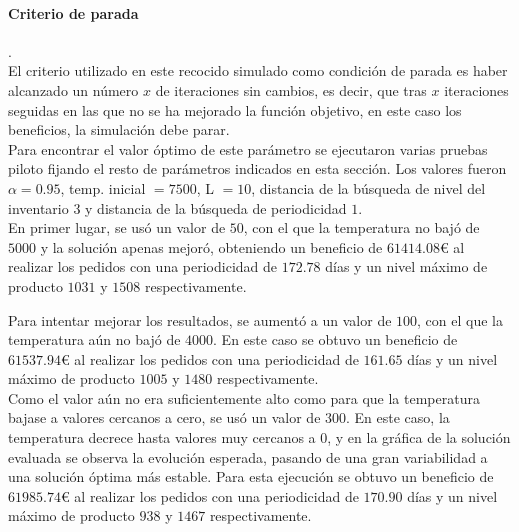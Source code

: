 \documentclass[a4paper,12pt]{article}
\begin{document}
	\paragraph{Criterio de parada}.\\
	El criterio utilizado en este recocido simulado como condición de parada es haber alcanzado un número $x$ de iteraciones sin cambios, es decir, que tras $x$ iteraciones seguidas en las que no se ha mejorado la función objetivo, en este caso los beneficios, la simulación debe parar.\\
		
	Para encontrar el valor óptimo de este parámetro se ejecutaron varias pruebas piloto fijando el resto de parámetros indicados en esta sección. Los valores fueron $\alpha = 0.95$, temp. inicial $=7500$, L $=10$, distancia de la búsqueda de nivel del inventario $3$ y distancia de la búsqueda de periodicidad $1$. \\ 
	
	En primer lugar, se usó un valor de $50$, con el que la temperatura no bajó de $5000$ y la solución apenas mejoró, obteniendo un beneficio de $61414.08$\euro \hspace{1mm} al realizar los pedidos con una periodicidad de $172.78$ días y un nivel máximo de producto $1031$ y $1508$ respectivamente.
	
	Para intentar mejorar los resultados, se aumentó a un valor de $100$, con el que la temperatura aún no bajó de $4000$. En este caso se obtuvo un beneficio de $61537.94$\euro \hspace{1mm} al realizar los pedidos con una periodicidad de $161.65$ días y un nivel máximo de producto $1005$ y $1480$ respectivamente.\\
	
	Como el valor aún no era suficientemente alto como para que la temperatura bajase a valores cercanos a cero, se usó un valor de $300$. En este caso, la temperatura decrece hasta valores muy cercanos a $0$, y en la gráfica de la solución evaluada se observa la evolución esperada, pasando de una gran variabilidad a una solución óptima más estable. Para esta ejecución se obtuvo un beneficio de $61985.74$\euro \hspace{1mm} al realizar los pedidos con una periodicidad de $170.90$ días y un nivel máximo de producto $938$ y $1467$ respectivamente.\\
	
\end{document}
